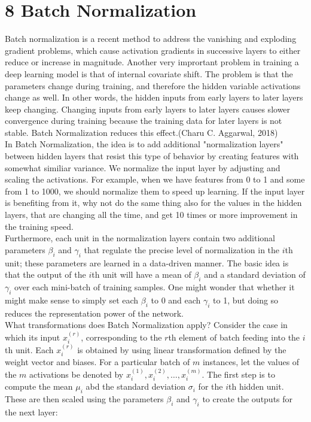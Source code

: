 \documentclass[11pt]{article}
\begin{document}
\section{8 Batch Normalization}
\hspace*{1cm} Batch normalization is a recent method to address the vanishing and exploding gradient problems, which cause activation gradients in
successive layers to either reduce or increase in magnitude. Another very imprortant problem in training a deep learning model is that of internal covariate shift. The problem is that the parameters change during training, and therefore the hidden variable activations change as well. In other words, the hidden inputs from early layers to later layers keep changing. Changing inputs from early layers to later layers causes slower convergence during training because the training data for later layers is not stable. Batch Normalization reduces this effect.(Charu C. Aggarwal, 2018) \\
In Batch Normalization, the idea is to add additional "normalization layers" between hidden layers that resist this type of behavior by creating features with somewhat similiar variance. We normalize the input layer by adjusting and scaling the activations. For example, when we have features from 0 to 1 and some from 1 to 1000, we should normalize them to speed up learning. If the input layer is benefiting from it, why not do the same thing also for the values in the hidden layers, that are changing all the time, and get 10 times or more improvement in the training speed. \cite{ioffe2015batch} 
\\
Furthermore, each unit in the normalization layers contain two additional parameters $\beta_i$ and $\gamma_i$ that regulate the precise level of normalization in the $i$th unit; these parameters are learned in a data-driven manner. The basic idea is that the output of the $i$th unit will have a mean of $\beta_i$ and a standard deviation of $\gamma_i$ over each mini-batch of training samples. One might wonder that whether it might make sense to simply set each $\beta_i$ to 0 and each $\gamma_i$ to 1, but doing so reduces the representation power of the network.\\
What transformations does Batch Normalization apply? Consider the case in which its input $x_{i}^{(r)}$, corresponding to the $r$th element of batch feeding into the $i$th unit. Each $x_{i}^{(r)}$ is obtained by using linear transformation defined by the weight vector and biases. For a particular batch of $m$ instances, let the values of the $m$ activations be denoted by 
$x_{i}^{(1)}, x_{i}^{(2)}, \dots, x_{i}^{(m)}$. The first step is to compute the mean $\mu_i$ abd the standard deviation $\sigma_i$ for the $i$th hidden unit. These are then scaled using the parameters $\beta_i$ and $\gamma_i$ to create the outputs for the next layer:
\end{document}
